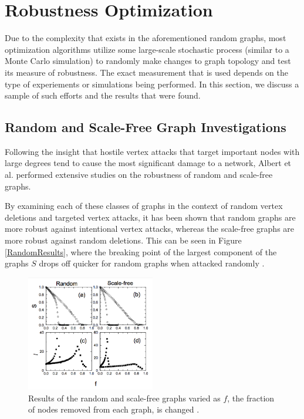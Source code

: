 \documentclass[doc]{apa}%
\begin{document}
\section{Robustness Optimization}

Due to the complexity that exists in the aforementioned random graphs, most optimization algorithms utilize some large-scale stochastic process (similar to a Monte Carlo simulation) to randomly make changes to graph topology and test its measure of robustness. The exact measurement that is used depends on the type of experiements or simulations being performed. In this section, we discuss a sample of such efforts and the results that were found.

\subsection{Random and Scale-Free Graph Investigations}


Following the insight that hostile vertex attacks that target important nodes with large degrees tend to cause the most significant damage to a network, Albert et al. performed extensive studies on the robustness of random and scale-free graphs. 

By examining each of these classes of graphs in the context of random vertex deletions and targeted vertex attacks, it has been shown that random graphs are more robust against intentional vertex attacks, whereas the scale-free graphs are more robust against random deletions. This can be seen in Figure \ref{RandomResults}, where the breaking point of the largest component of the graphs $S$ drops off quicker for random graphs when attacked randomly \cite{GraphThesis}. 

\begin{figure}[h!]
	\label{fig:RandomResults}
	\centering
		\includegraphics[width=0.5\textwidth]{random_results.png}
	\caption{Results of the random and scale-free graphs varied as $f$, the fraction of nodes removed from each graph, is changed . } %
\end{figure}
\end{document}
